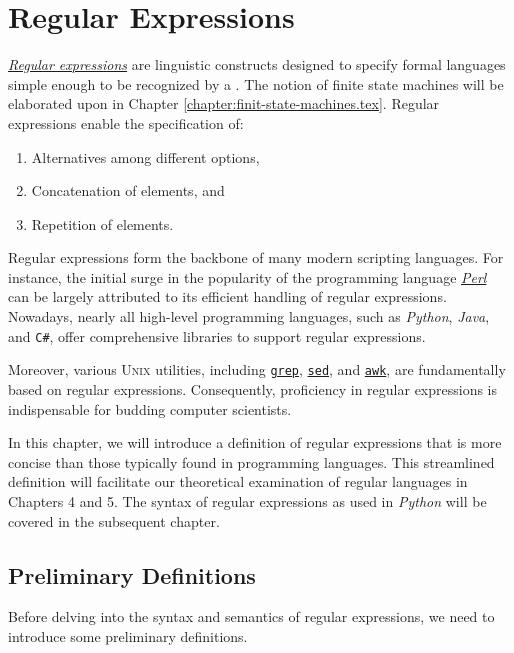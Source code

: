 \chapter{Regular Expressions \label{chapter:regular-expressions}}
\href{http://en.wikipedia.org/wiki/Regular_expression}{\emph{Regular expressions}} are linguistic constructs designed to specify formal languages simple enough to be recognized by a . The notion of finite state machines will be elaborated upon in Chapter \ref{chapter:finit-state-machines.tex}. Regular expressions enable the specification of:

\begin{enumerate}
\item Alternatives among different options,
\item Concatenation of elements, and
\item Repetition of elements.
\end{enumerate}

Regular expressions form the backbone of many modern scripting languages. For instance, the initial surge in the popularity of the programming language \href{http://en.wikipedia.org/wiki/Perl}{\textsl{Perl}} can be largely attributed to its efficient handling of regular expressions. Nowadays, nearly all high-level programming languages, such as \textsl{Python}, \textsl{Java}, and \texttt{C\#}, offer comprehensive libraries to support regular expressions. 

Moreover, various \textsc{Unix} utilities, including \href{http://en.wikipedia.org/wiki/Grep}{\texttt{grep}}, \href{http://en.wikipedia.org/wiki/Sed}{\texttt{sed}}, and \href{http://en.wikipedia.org/wiki/Awk}{\texttt{awk}}, are fundamentally based on regular expressions. Consequently, proficiency in regular expressions is indispensable for budding computer scientists.

In this chapter, we will introduce a definition of regular expressions that is more concise than those typically found in programming languages. This streamlined definition will facilitate our theoretical examination of regular languages in Chapters 4 and 5. The syntax of regular expressions as used in \textsl{Python} will be covered in the subsequent chapter.

\section{Preliminary Definitions}
Before delving into the syntax and semantics of regular expressions, we need to introduce some preliminary definitions.

